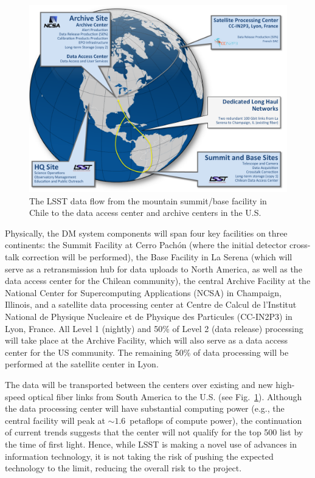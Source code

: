 \documentclass[11pt,twoside]{article}
\begin{document}
\begin{figure}
%
%
\hskip 0.25in
\includegraphics[width=0.95\hsize,clip]{DMX2.pdf}
\caption{The LSST data flow from the mountain summit/base facility in
Chile to the data access center and archive centers in the U.S.}
\label{Fig:DM2}
\end{figure}

Physically, the DM system components will span four key facilities on three
continents: the Summit Facility at  Cerro Pach\'on (where the initial
detector cross-talk 
correction will be performed), the Base Facility in La Serena (which will serve
as a retransmission hub for data 
uploads to North America, as well as the data access center for the Chilean
community), the central Archive Facility at the National Center
for Supercomputing Applications (NCSA) in Champaign, Illinois, and a
satellite data processing center at Centre de Calcul de l'Institut National 
de Physique Nucleaire et de Physique des Particules (CC-IN2P3) in Lyon, France.
All Level 1 (nightly) and 50\% of Level 2 (data release) processing will take place at the
Archive Facility, which will also serve as a data access center
for the US community. The remaining 50\% of data processing will be performed at
the satellite center in Lyon.

The data will be transported between the centers over existing and new high-speed optical fiber 
links from South America to the U.S. (see Fig.~\ref{Fig:DM2}).
Although the data processing center will have substantial computing 
power (e.g., the central facility will peak at $\sim 1.6$~petaflops of 
compute power), the continuation of current trends suggests that the center will 
not qualify for the top 500 list by the time of first light.
Hence, while LSST is making a novel use of advances in information technology, 
it is not taking the risk of pushing the expected technology to the limit, reducing
the overall risk to the project. 
\\
\end{document}
